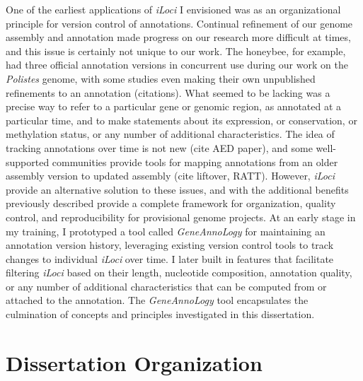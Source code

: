One of the earliest applications of \textit{iLoci} I envisioned was as an organizational principle for version control of annotations.
Continual refinement of our genome assembly and annotation made progress on our research more difficult at times, and this issue is certainly not unique to our work.
The honeybee, for example, had three official annotation versions in concurrent use during our work on the \textit{Polistes} genome, with some studies even making their own unpublished refinements to an annotation (citations).
What seemed to be lacking was a precise way to refer to a particular gene or genomic region, as annotated at a particular time, and to make statements about its expression, or conservation, or methylation status, or any number of additional characteristics.
The idea of tracking annotations over time is not new (cite AED paper), and some well-supported communities provide tools for mapping annotations from an older assembly version to updated assembly (cite liftover, RATT).
However, \textit{iLoci} provide an alternative solution to these issues, and with the additional benefits previously described provide a complete framework for organization, quality control, and reproducibility for provisional genome projects.
At an early stage in my training, I prototyped a tool called \textit{GeneAnnoLogy} for maintaining an annotation version history, leveraging existing version control tools to track changes to individual \textit{iLoci} over time.
I later built in features that facilitate filtering \textit{iLoci} based on their length, nucleotide composition, annotation quality, or any number of additional characteristics that can be computed from or attached to the annotation.
The \textit{GeneAnnoLogy} tool encapsulates the culmination of concepts and principles investigated in this dissertation.

\section{Dissertation Organization}

